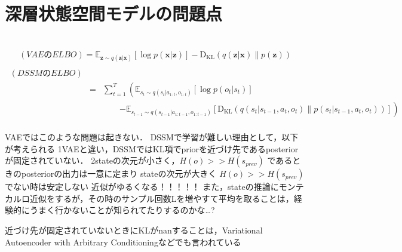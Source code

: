 \section{深層状態空間モデルの問題点}
\begin{eqnarray}
  \end{eqnarray}
  
\begin{eqnarray}
    (VAEのELBO) \nonumber = \mathbb{E}_{\bm{z} \sim q(\bm{z}|\bm{x})} [\log p(\bm{x}|\bm{z})] - \mathrm{D_{KL}}(q(\bm{z}|\bm{x}) \| p(\bm{z})) \label{eq:vae_elbo2} \\
\end{eqnarray}
\begin{eqnarray}
    \ (DSSMのELBO) \nonumber \\
    &=& \sum_{t=1}^T \left( \mathbb{E}_{s_t \sim q(s_t|a_{1:t}, o_{1:t})} [\log p(o_t|s_t)] \right. \nonumber \\
    && \hspace{2em} \left. - \mathbb{E}_{s_{t-1} \sim q(s_{t-1}|a_{1:t-1}, o_{1:t-1})} [\mathrm{D_{KL}}(q(s_t|s_{t-1}, a_t, o_t) \| p(s_t|s_{t-1}, a_t, o_t))] \right)  \nonumber \\
    \label{eq:dssm_elbo2}
  \end{eqnarray}

VAEではこのような問題は起きない．
DSSMで学習が難しい理由として，以下が考えられる
1VAEと違い，DSSMではKL項でpriorを近づけ先であるposteriorが固定されていない．
2stateの次元が小さく，$H(o) >> H(s_{prev})$ であるときのposteriorの出力は一意に定まり
stateの次元が大きく $H(o) >> H(s_{prev})$でない時は安定しない
近似がゆるくなる！！！！！
また，stateの推論にモンテカルロ近似をするが，その時のサンプル回数Lを増やすて平均を取ることは，経験的にうまく行かないことが知られてたりするのかな…?

近づけ先が固定されていないときにKLがnanすることは，Variational Autoencoder with Arbitrary Conditioningなどでも言われている
